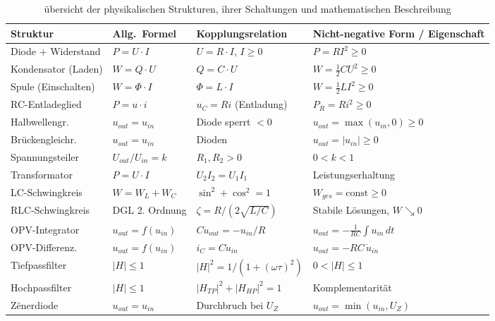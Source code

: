 ﻿\documentclass[12pt, a4paper]{article}
\begin{document}
	\begin{table}[h]
		\centering
		\caption{übersicht der physikalischen Strukturen, ihrer Schaltungen und mathematischen Beschreibung}
		\begin{tabular}{>{\raggedright\arraybackslash}p{3cm}>{\raggedright\arraybackslash}p{3cm}>{\raggedright\arraybackslash}p{3cm}>{\raggedright\arraybackslash}p{4cm}}
			\toprule
			\textbf{Struktur} & \textbf{Allg.\ Formel} & \textbf{Kopplungs\-relation} & \textbf{Nicht-negative Form / Eigenschaft} \\
			\midrule
			Diode + Widerstand & $P = U \cdot I$ & $U = R\cdot I$, $I \geq 0$ & $P = R I^2 \geq 0$ \\
			Kondensator (Laden) & $W = Q \cdot U$ & $Q = C \cdot U$ & $W = \tfrac{1}{2}CU^2 \geq 0$ \\
			Spule (Einschalten) & $W = \Phi \cdot I$ & $\Phi = L \cdot I$ & $W = \tfrac{1}{2}LI^2 \geq 0$ \\
			RC-Entladeglied & $P = u \cdot i$ & $u_C = Ri$ (Entladung) & $P_R = Ri^2 \geq 0$ \\
			Halbwellengr. & $u_{out} = u_{in}$ & Diode sperrt $<0$ & $u_{out} = \max(u_{in},0) \geq 0$ \\
			Brückengleichr. & $u_{out} = u_{in}$ & 4 Dioden & $u_{out} = |u_{in}| \geq 0$ \\
			Spannungsteiler & $U_{out}/U_{in} = k$ & $R_1, R_2 > 0$ & $0 < k < 1$ \\
			Transformator & $P = U \cdot I$ & $U_2 I_2 = U_1 I_1$ & Leistungserhaltung \\
			LC-Schwingkreis & $W = W_L + W_C$ & $\sin^2 + \cos^2 = 1$ & $W_{ges} = \text{const} \geq 0$ \\
			RLC-Schwingkreis & DGL 2. Ordnung & $\zeta = R/(2\sqrt{L/C})$ & Stabile Lösungen, $W \searrow 0$ \\
			OPV-Integrator & $u_{out} = f(u_{in})$ & $C \dot{u}_{out} = -u_{in}/R$ & $u_{out} = -\tfrac{1}{RC}\int u_{in}\,dt$ \\
			OPV-Differenz. & $u_{out} = f(u_{in})$ & $i_C = C\dot{u}_{in}$ & $u_{out} = -RC\,\dot{u}_{in}$ \\
			Tiefpassfilter & $|H| \leq 1$ & $|H|^2 = 1/(1+(\omega\tau)^2)$ & $0 < |H| \leq 1$ \\
			Hochpassfilter & $|H| \leq 1$ & $|H_{TP}|^2 + |H_{HP}|^2 = 1$ & Komplementarität \\
			Z\"{e}nerdiode & $u_{out} = u_{in}$ & Durchbruch bei $U_Z$ & $u_{out} = \min(u_{in}, U_Z)$ \\
			\bottomrule
		\end{tabular}
		\label{tab:uebersicht}
	\end{table}
	
\end{document}
